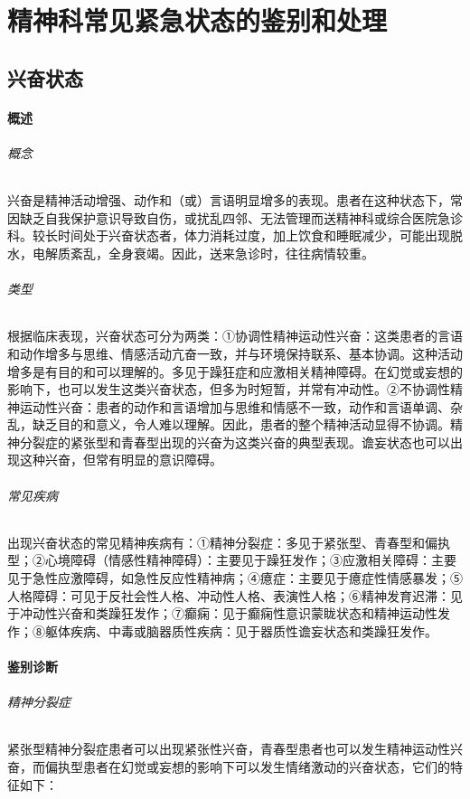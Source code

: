 \chapter{精神科常见紧急状态的鉴别和处理}

\section{兴奋状态}

\subsubsection{概述}

\subparagraph{概念}

兴奋是精神活动增强、动作和（或）言语明显增多的表现。患者在这种状态下，常因缺乏自我保护意识导致自伤，或扰乱四邻、无法管理而送精神科或综合医院急诊科。较长时间处于兴奋状态者，体力消耗过度，加上饮食和睡眠减少，可能出现脱水，电解质紊乱，全身衰竭。因此，送来急诊时，往往病情较重。

\subparagraph{类型}

根据临床表现，兴奋状态可分为两类：①协调性精神运动性兴奋：这类患者的言语和动作增多与思维、情感活动亢奋一致，并与环境保持联系、基本协调。这种活动增多是有目的和可以理解的。多见于躁狂症和应激相关精神障碍。在幻觉或妄想的影响下，也可以发生这类兴奋状态，但多为时短暂，并常有冲动性。②不协调性精神运动性兴奋：患者的动作和言语增加与思维和情感不一致，动作和言语单调、杂乱，缺乏目的和意义，令人难以理解。因此，患者的整个精神活动显得不协调。精神分裂症的紧张型和青春型出现的兴奋为这类兴奋的典型表现。谵妄状态也可以出现这种兴奋，但常有明显的意识障碍。

\subparagraph{常见疾病}

出现兴奋状态的常见精神疾病有：①精神分裂症：多见于紧张型、青春型和偏执型；②心境障碍（情感性精神障碍）：主要见于躁狂发作；③应激相关障碍：主要见于急性应激障碍，如急性反应性精神病；④癔症：主要见于癔症性情感暴发；⑤人格障碍：可见于反社会性人格、冲动性人格、表演性人格；⑥精神发育迟滞：见于冲动性兴奋和类躁狂发作；⑦癫痫：见于癫痫性意识蒙眬状态和精神运动性发作；⑧躯体疾病、中毒或脑器质性疾病：见于器质性谵妄状态和类躁狂发作。

\subsubsection{鉴别诊断}

\subparagraph{精神分裂症}

紧张型精神分裂症患者可以出现紧张性兴奋，青春型患者也可以发生精神运动性兴奋，而偏执型患者在幻觉或妄想的影响下可以发生情绪激动的兴奋状态，它们的特征如下：

